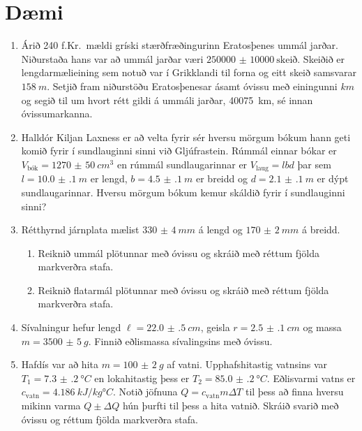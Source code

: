 \ifdefined \wholebook \else\documentclass[oneside]{book}\usepackage{EdlBook}\graphicspath{{figures/}}
\begin{document}
\section{Dæmi}


\begin{enumerate}[label = \textbf{Dæmi \thechapter.\arabic*.}]

\item Árið 240 f.Kr.~mældi gríski stærðfræðingurinn Eratosþenes ummál jarðar. Niðurstaða hans var að ummál jarðar væri $\SI{250000(10000)}{\text{skeið}}$. Skeiðið er lengdarmælieining sem notuð var í Grikklandi til forna og eitt skeið samsvarar $\SI{158}{m}$. Setjið fram niðurstöðu Eratosþenesar ásamt óvissu með einingunni $\si{km}$ og segið til um hvort rétt gildi á ummáli jarðar, \SI{40075}{km}, sé innan óvissumarkanna.

\item Halldór Kiljan Laxness er að velta fyrir sér hversu mörgum bókum hann geti komið fyrir í sundlauginni sinni við Gljúfrastein. Rúmmál einnar bókar er $V_{\text{bók}} = \SI{1270(50)}{cm^3}$ en rúmmál sundlaugarinnar er $V_{\text{laug}} = lbd$ þar sem $l = \SI{10.0(1)}{m}$ er lengd, $b = \SI{4.5(1)}{m}$ er breidd og $d = \SI{2.1(1)}{m}$ er dýpt sundlaugarinnar. Hversu mörgum bókum kemur skáldið fyrir í sundlauginni sinni?

\item Rétthyrnd járnplata mælist $\SI{330(4)}{mm}$ á lengd og $\SI{170(2)}{mm}$ á breidd.
\begin{enumerate}[label = \textbf{(\alph*)}]
    \item Reiknið ummál plötunnar með óvissu og skráið með réttum fjölda markverðra stafa.
    \item Reiknið flatarmál plötunnar með óvissu og skráið með réttum fjölda markverðra stafa.
\end{enumerate}

\item Sívalningur hefur lengd $\ell = \SI{22.0(5)}{cm}$, geisla $r = \SI{2.5(1)}{cm}$ og massa $m = \SI{3500(5)}{g}$. Finnið eðlismassa sívalingsins með óvissu.

\item Hafdís var að hita $m = \SI{100(2)}{g}$ af vatni. Upphafshitastig vatnsins var $T_1 = \SI{7.3(2)}{\degree C}$ en lokahitastig þess er $T_2 = \SI{85.0(2)}{\degree C}$. Eðlisvarmi vatns er $c_{\text{vatn}} = \SI{4.186}{kJ/kg\degree C}$. Notið jöfnuna $Q = c_{\text{vatn}}m\Delta T$ til þess að finna hversu mikinn varma $Q \pm \Delta Q$ hún þurfti til þess a hita vatnið. Skráið svarið með óvissu og réttum fjölda markverðra stafa.


\end{enumerate}
\end{document}
